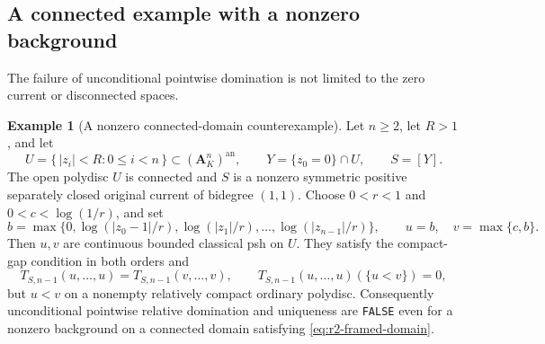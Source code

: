 \documentclass[11pt,a4paper]{article}
\numberwithin{equation}{section}
\theoremstyle{definition}
\newtheorem{example}[theorem]{Example}
\theoremstyle{remark}
\begin{document}


\subsection{A connected example with a nonzero background}
\label{subsec:r2-nonzero-background-counterexample}

The failure of unconditional pointwise domination is not limited to
the zero current or disconnected spaces.

\begin{example}[A nonzero connected-domain counterexample]
\label{ex:r2-nonzero-domination-failure}
Let $n\geq2$, let $R>1$, and let
\[
 U=\{\,|z_i|<R:0\leq i<n\,\}\subset(\mathbf A_K^n)^{\mathrm{an}},
 \qquad Y=\{z_0=0\}\cap U,
 \qquad S=[Y].
\]
The open polydisc $U$ is connected and $S$ is a nonzero symmetric
positive separately closed original current of bidegree $(1,1)$.
Choose $0<r<1$ and $0<c<\log(1/r)$, and set
\[
 b=\max\bigl\{0,\log(|z_0-1|/r),
                    \log(|z_1|/r),\ldots,
                    \log(|z_{n-1}|/r)\bigr\},
 \qquad u=b,\quad v=\max\{c,b\}.
\]
Then $u,v$ are continuous bounded classical psh on $U$. They satisfy
the compact-gap condition in both orders and
\[
 T_{S,n-1}(u,\ldots,u)=T_{S,n-1}(v,\ldots,v),
 \qquad
 T_{S,n-1}(u,\ldots,u)(\{u<v\})=0,
\]
but $u<v$ on a nonempty relatively compact ordinary polydisc.
Consequently unconditional pointwise relative domination and
uniqueness are \texttt{FALSE} even for a nonzero background on a
connected domain satisfying \eqref{eq:r2-framed-domain}.
\end{example}
\end{document}
